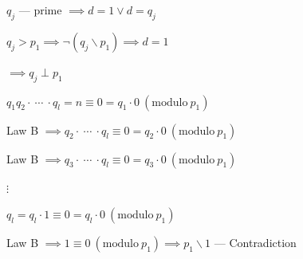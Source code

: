 \documentclass{article}
\begin{document}
\( q_{j} \) --- prime \( \implies d = 1 \lor d = q_{j} \)

\( q_{j} > p_{1} \implies \lnot(q_{j} \backslash p_{1}) \implies d = 1 \)

\( \implies q_{j} \perp p_{1} \)

\( q_{1}q_{2} \cdot\ \cdots\ \cdot q_{l} = n \equiv 0 = q_{1} \cdot 0\ (\mathrm{modulo}\ p_{1}) \)

Law B \( \implies q_{2} \cdot\ \cdots\ \cdot q_{l} \equiv 0 = q_{2} \cdot 0\ (\mathrm{modulo}\ p_{1}) \)

Law B \( \implies q_{3} \cdot\ \cdots\ \cdot q_{l} \equiv 0 = q_{3} \cdot 0\ (\mathrm{modulo}\ p_{1}) \)

\( \vdots \)

\( q_{l} = q_{l} \cdot 1 \equiv 0 = q_{l} \cdot 0\ (\mathrm{modulo}\ p_{1}) \)

Law B \( \implies 1 \equiv 0\ (\mathrm{modulo}\ p_{1}) \implies p_{1} \backslash 1 \) --- Contradiction
\end{document}
